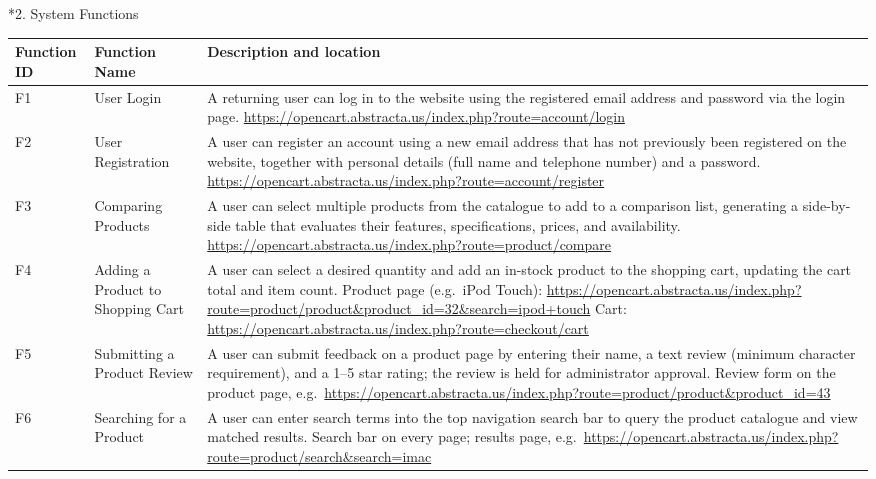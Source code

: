 \documentclass[11pt,a4paper]{article}
\makeatletter
\renewcommand\section{\@startsection{section}{1}{0pt}{3ex plus 1ex}{1.2ex}{\LARGE\bfseries}}
\makeatother
\begin{document}
\section*{2. System Functions}

{\renewcommand{\arraystretch}{1.3}
\begin{longtable}{|M{2.6cm}|M{3.4cm}|L{10.0cm}|}
\hline
\textbf{Function ID} & \textbf{Function Name} & \textbf{Description and location} \\ \hline
\endhead
F1 & User Login &
A returning user can log in to the website using the registered email address and password via the login page.\newline
\url{https://opencart.abstracta.us/index.php?route=account/login} \\ \hline
F2 & User Registration &
A user can register an account using a new email address that has not previously been registered on the website, together with personal details (full name and telephone number) and a password.\newline
\url{https://opencart.abstracta.us/index.php?route=account/register} \\ \hline
F3 & Comparing Products &
A user can select multiple products from the catalogue to add to a comparison list, generating a side-by-side table that evaluates their features, specifications, prices, and availability.\newline
\url{https://opencart.abstracta.us/index.php?route=product/compare} \\ \hline
F4 & Adding a Product to Shopping Cart &
A user can select a desired quantity and add an in-stock product to the shopping cart, updating the cart total and item count.\newline
Product page (e.g.\ iPod Touch): \url{https://opencart.abstracta.us/index.php?route=product/product&product_id=32&search=ipod+touch}\newline
Cart: \url{https://opencart.abstracta.us/index.php?route=checkout/cart} \\ \hline
F5 & Submitting a Product Review &
A user can submit feedback on a product page by entering their name, a text review (minimum character requirement), and a 1--5 star rating; the review is held for administrator approval.\newline
Review form on the product page, e.g.\ \url{https://opencart.abstracta.us/index.php?route=product/product&product_id=43} \\ \hline
F6 & Searching for a Product &
A user can enter search terms into the top navigation search bar to query the product catalogue and view matched results.\newline
Search bar on every page; results page, e.g.\ \url{https://opencart.abstracta.us/index.php?route=product/search&search=imac} \\ \hline
\end{longtable}}
\end{document}
